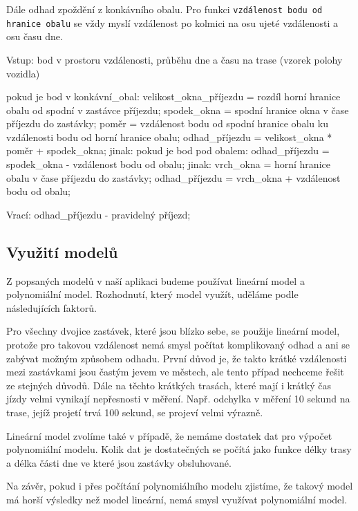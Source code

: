 Dále odhad zpoždění z konkávního obalu. Pro funkci \verb-vzdálenost bodu od hranice obalu- se vždy myslí vzdálenost po kolmici na osu ujeté vzdálenosti a osu času dne.


\begin{code}[frame=none]
Vstup: bod v prostoru vzdálenosti, průběhu dne
  a času na trase (vzorek polohy vozidla)


pokud je bod v konkávní_obal:
  velikost_okna_příjezdu = rozdíl horní hranice obalu od spodní
    v zastávce příjezdu;
  spodek_okna = spodní hranice okna v čase
    příjezdu do zastávky;
  poměr = vzdálenost bodu od spodní hranice obalu
ku vzdálenosti bodu od horní hranice obalu;
  odhad_příjezdu = velikost_okna * poměr + spodek_okna;
jinak:
  pokud je bod pod obalem:
    odhad_příjezdu = spodek_okna - vzdálenost bodu od obalu;
  jinak:
    vrch_okna = horní hranice obalu
  v čase příjezdu do zastávky;
    odhad_příjezdu = vrch_okna + vzdálenost bodu od obalu;


Vrací: odhad_příjezdu - pravidelný příjezd;
\end{code}


\subsection{Využití modelů}


Z popsaných modelů v naší aplikaci budeme používat lineární model a polynomiální model. Rozhodnutí, který model využít, uděláme podle následujících faktorů.


\bigbreak


Pro všechny dvojice zastávek, které jsou blízko sebe, se použije lineární model, protože pro takovou vzdálenost nemá smysl počítat komplikovaný odhad a ani se zabývat možným způsobem odhadu. První důvod je, že takto krátké vzdálenosti mezi zastávkami jsou častým jevem ve městech, ale tento případ nechceme řešit ze stejných důvodů. Dále na těchto krátkých trasách, které mají i krátký čas jízdy velmi vynikají nepřesnosti v měření. Např. odchylka v měření 10 sekund na trase, jejíž projetí trvá 100 sekund, se projeví velmi výrazně.


\bigbreak


Lineární model zvolíme také v případě, že nemáme dostatek dat pro výpočet polynomiální modelu. Kolik dat je dostatečných se počítá jako funkce délky trasy a délka části dne ve které jsou zastávky obsluhované.


\bigbreak


Na závěr, pokud i přes počítání polynomiálního modelu zjistíme, že takový model má horší výsledky než model lineární, nemá smysl využívat polynomiální model.


